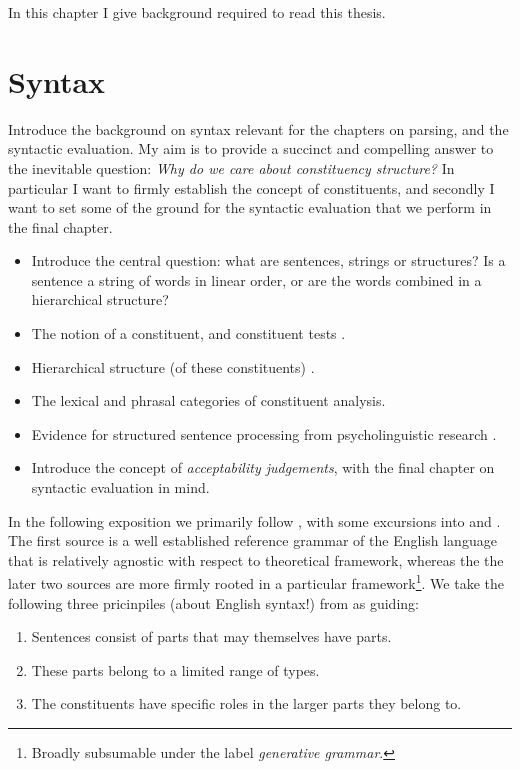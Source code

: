 % 

In this chapter I give background required to read this thesis.

\section{Syntax}
Introduce the background on syntax relevant for the chapters on parsing, and the syntactic evaluation. My aim is to provide a succinct and compelling answer to the inevitable question: \textit{Why do we care about constituency structure?} In particular I want to firmly establish the concept of constituents, and secondly I want to set some of the ground for the syntactic evaluation that we perform in the final chapter.
\begin{itemize}
  \item Introduce the central question: what are sentences, strings or structures? Is a sentence a string of words in linear order, or are the words combined in a hierarchical structure? \citep{everaert2015structures,frank2012hierarchical}
  \item The notion of a constituent, and constituent tests \citet{carnie2010constituent,huddleston2002grammar}.
  \item Hierarchical structure (of these constituents) \citet{everaert2015structures}.
  \item The lexical and phrasal categories of constituent analysis.
  \item Evidence for structured sentence processing from psycholinguistic research \citep{hale2001earley,levy2008expectation,brennan2016abstract}.
  \item Introduce the concept of \textit{acceptability judgements}, with the final chapter on syntactic evaluation in mind.
\end{itemize}

In the following exposition we primarily follow \citet{huddleston2002grammar}, with some excursions into \citet{carnie2010constituent} and \citet{everaert2015structures}. The first source is a well established reference grammar of the English language that is relatively agnostic with respect to theoretical framework, whereas the the later two sources are more firmly rooted in a particular framework\footnote{Broadly subsumable under the label \textit{generative grammar}.}. We take the following three pricinpiles (about English syntax!) from \citep{huddleston2002grammar} as guiding:
\begin{enumerate}[label=(\roman*)]
  \item Sentences consist of parts that may themselves have parts.
  \item These parts belong to a limited range of types.
  \item The constituents have specific roles in the larger parts they belong to.
\end{enumerate}

